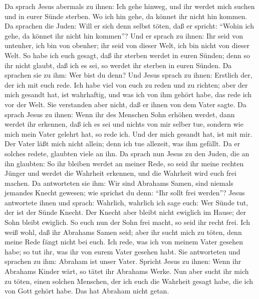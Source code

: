  Da sprach Jesus abermals zu ihnen: Ich gehe hinweg, und
ihr werdet mich suchen und in eurer Sünde sterben. Wo ich hin gehe, da
könnet ihr nicht hin kommen.  Da sprachen die Juden: Will
er sich denn selbst töten, daß er spricht: ``Wohin ich gehe, da könnet
ihr nicht hin kommen''?  Und er sprach zu ihnen: Ihr seid
von untenher, ich bin von obenher; ihr seid von dieser Welt, ich bin
nicht von dieser Welt.  So habe ich euch gesagt, daß ihr
sterben werdet in euren Sünden; denn so ihr nicht glaubt, daß ich es
sei, so werdet ihr sterben in euren Sünden.  Da sprachen
sie zu ihm: Wer bist du denn? Und Jesus sprach zu ihnen: Erstlich der,
der ich mit euch rede.  Ich habe viel von euch zu reden und
zu richten; aber der mich gesandt hat, ist wahrhaftig, und was ich von
ihm gehört habe, das rede ich vor der Welt.  Sie verstanden
aber nicht, daß er ihnen von dem Vater sagte.  Da sprach
Jesus zu ihnen: Wenn ihr des Menschen Sohn erhöhen werdet, dann werdet
ihr erkennen, daß ich es sei und nichts von mir selber tue, sondern wie
mich mein Vater gelehrt hat, so rede ich.  Und der mich
gesandt hat, ist mit mir. Der Vater läßt mich nicht allein; denn ich tue
allezeit, was ihm gefällt.  Da er solches redete, glaubten
viele an ihn.  Da sprach nun Jesus zu den Juden, die an ihn
glaubten: So ihr bleiben werdet an meiner Rede, so seid ihr meine
rechten Jünger  und werdet die Wahrheit erkennen, und die
Wahrheit wird euch frei machen.  Da antworteten sie ihm:
Wir sind Abrahams Samen, sind niemals jemandes Knecht gewesen; wie
sprichst du denn: ``Ihr sollt frei werden''?  Jesus
antwortete ihnen und sprach: Wahrlich, wahrlich ich sage euch: Wer Sünde
tut, der ist der Sünde Knecht.  Der Knecht aber bleibt
nicht ewiglich im Hause; der Sohn bleibt ewiglich.  So euch
nun der Sohn frei macht, so seid ihr recht frei.  Ich weiß
wohl, daß ihr Abrahams Samen seid; aber ihr sucht mich zu töten, denn
meine Rede fängt nicht bei euch.  Ich rede, was ich von
meinem Vater gesehen habe; so tut ihr, was ihr von eurem Vater gesehen
habt.  Sie antworteten und sprachen zu ihm: Abraham ist
unser Vater. Spricht Jesus zu ihnen: Wenn ihr Abrahams Kinder wärt, so
tätet ihr Abrahams Werke.  Nun aber sucht ihr mich zu
töten, einen solchen Menschen, der ich euch die Wahrheit gesagt habe,
die ich von Gott gehört habe. Das hat Abraham nicht getan. 
